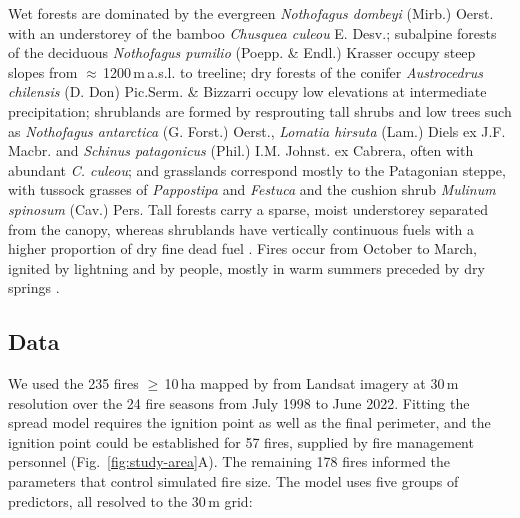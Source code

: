 \documentclass[ResearchPaper,linenum]{CSIRO_LaTeX_Template}
\begin{document}
Wet forests are dominated by the evergreen \textit{Nothofagus dombeyi} (Mirb.) Oerst.
with an understorey of the bamboo \textit{Chusquea culeou} E. Desv.; subalpine forests
of the deciduous \textit{Nothofagus pumilio} (Poepp. \& Endl.) Krasser occupy steep
slopes from $\approx$\,1200\,m\,a.s.l. to treeline; dry forests of the conifer
\textit{Austrocedrus chilensis} (D. Don) Pic.Serm. \& Bizzarri occupy low elevations at
intermediate precipitation; shrublands are formed by resprouting tall shrubs and low
trees such as \textit{Nothofagus antarctica} (G. Forst.) Oerst., \textit{Lomatia
hirsuta} (Lam.) Diels ex J.F. Macbr. and \textit{Schinus patagonicus} (Phil.) I.M.
Johnst. ex Cabrera, often with abundant \textit{C. culeou}; and grasslands correspond
mostly to the Patagonian steppe, with tussock grasses of \textit{Pappostipa} and
\textit{Festuca} and the cushion shrub \textit{Mulinum spinosum} (Cav.) Pers. Tall
forests carry a sparse, moist understorey separated from the canopy, whereas shrublands
have vertically continuous fuels with a higher proportion of dry fine dead fuel
\citep{paritsis_positive_2015, tiribelli_changes_2018, barbera_microclimate_2023}.
Fires occur from October to March, ignited by lightning and by people, mostly in warm
summers preceded by dry springs \citep{kitzberger_climatic_1997, veblen_fire_2003}.

\subsection{Data}

We used the 235 fires $\ge$\,10\,ha mapped by \citet{barbera_patterns} from Landsat
imagery at 30\,m resolution over the 24 fire seasons from July 1998 to June 2022.
Fitting the spread model requires the ignition point as well as the final perimeter,
and the ignition point could be established for 57 fires, supplied by fire management
personnel (Fig.~\ref{fig:study-area}A). The remaining 178 fires informed the parameters that
control simulated fire size. The model uses five groups of predictors, all resolved
to the 30\,m grid:
\end{document}
